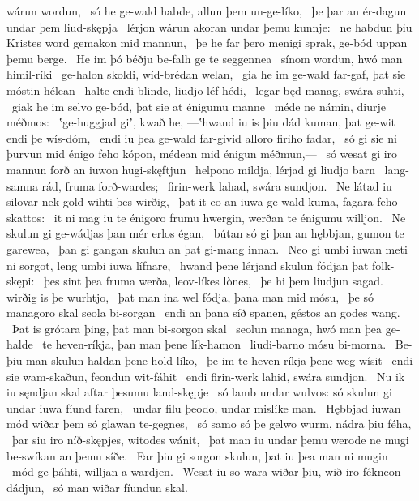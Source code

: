 wárun wordun, \hld\ só he ge-wald habde,
allun þem un-ge-líko, \hld\ þe þar an ér-dagun
undar þem liud-skępja \hld\ lérjon wárun
akoran undar þemu kunnje: \hld\ ne habdun þiu Kristes word
gemakon mid mannun, \hld\ þe he far þero menigi sprak,
ge-bód uppan þemu berge. \hld\ He im þó béðju be-falh
ge te seggennea \hld\ sínom wordun,
hwó man himil-ríki \hld\ ge-halon skoldi,
wíd-brédan welan, \hld\ gia he im ge-wald far-gaf,
þat sie móstin hélean \hld\ halte endi blinde,
liudjo léf-hédi, \hld\ legar-będ manag,
swára suhti, \hld\ giak he im selvo ge-bód,
þat sie at énigumu manne \hld\ méde ne námin,
diurje méðmos: \hld\ ʽge-huggjad giʼ, kwað he, —ʽhwand iu is þiu dád kuman,
þat ge-wit endi þe wís-dóm, \hld\ endi iu þea ge-wald far-givid
alloro firiho fadar, \hld\ só gi sie ni þurvun mid énigo feho kópon,
médean mid énigun méðmun,— \hld\ só wesat gi iro mannun forð
an iuwon hugi-skęftjun \hld\ helpono mildja,
lérjad gi liudjo barn \hld\ lang-samna rád,
fruma forð-wardes; \hld\ firin-werk lahad,
swára sundjon. \hld\ Ne látad iu silovar nek gold
wihti þes wirðig, \hld\ þat it eo an iuwa ge-wald kuma,
fagara feho-skattos: \hld\ it ni mag iu te énigoro frumu hwergin,
werðan te énigumu willjon. \hld\ Ne skulun gi ge-wádjas þan mér
erlos égan, \hld\ bútan só gi þan an hębbjan,
gumon te garewea, \hld\ þan gi gangan skulun
an þat gi-mang innan. \hld\ Neo gi umbi iuwan meti ni sorgot,
leng umbi iuwa lífnare, \hld\ hwand þene lérjand skulun
fódjan þat folk-skępi: \hld\ þes sint þea fruma werða,
leov-líkes lònes, \hld\ þe hi þem liudjun sagad.
wirðig is þe wurhtjo, \hld\ þat man ina wel fódja,
þana man mid mósu, \hld\ þe só managoro skal
seola bi-sorgan \hld\ endi an þana síð spanen,
géstos an godes wang. \hld\ Þat is grótara þing,
þat man bi-sorgon skal \hld\ seolun managa,
hwó man þea ge-halde \hld\ te heven-ríkja,
þan man þene lík-hamon \hld\ liudi-barno
mósu bi-morna. \hld\ Be-þiu man skulun
haldan þene hold-líko, \hld\ þe im te heven-ríkja
þene weg wísit \hld\ endi sie wam-skaðun,
feondun wit-fáhit \hld\ endi firin-werk lahid,
swára sundjon. \hld\ Nu ik iu sęndjan skal
aftar þesumu land-skępje \hld\ só lamb undar wulvos:
só skulun gi undar iuwa fíund faren, \hld\ undar filu þeodo,
undar mislíke man. \hld\ Hębbjad iuwan mód wiðar þem
só glawan te-gegnes, \hld\ só samo só þe gelwo wurm,
nádra þiu féha, \hld\ þar siu iro níð-skępjes,
witodes wánit, \hld\ þat man iu undar þemu werode ne mugi
be-swíkan an þemu síðe. \hld\ Far þiu gi sorgon skulun,
þat iu þea man ni mugin \hld\ mód-ge-þáhti,
willjan a-wardjen. \hld\ Wesat iu so wara wiðar þiu,
wið iro fékneon dádjun, \hld\ só man wiðar fíundun skal.
